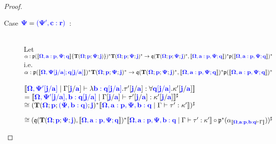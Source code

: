 \documentclass[sigplan,10pt,review,anonymous]{acmart}
\newcommand{\blum}[1]{\mathbf{\color{blue}{#1}}}
\newcommand{\sem}[1]{\llbracket #1 \rrbracket}
\newcommand{\mbf}[1]{\mathbf{#1}}
\begin{document}
\begin{proof}
\begin{description}
\begin{description}
\item[Case $\blum{\Psi} = \blum{(\Psi', c : r)}$~:]~\\
Let $\alpha : \frak p(\sem{\blum{\Omega,a:p,\Psi ; q}} \{ \mbf{T}(\blum{\Omega}; \blum{p}; \blum{\Psi}; \blum{j} ) \})^* \mbf{T}(\blum{\Omega}; \blum{p}; \blum{\Psi}; \blum{j} )^* \to \frak q(\mbf{T}(\blum{\Omega};\blum{p};\blum{\Psi};\blum{j})^*, \sem{\blum{\Omega,a:p,\Psi ; q}})^* \frak p(\sem{\blum{\Omega,a:p,\Psi ; q}})^*$\\
i.e. $\alpha : \frak p(\sem{\blum{\Omega,\Psi[j/a] ; q[j/a]}})^* \mbf{T}(\blum{\Omega}; \blum{p}; \blum{\Psi}; \blum{j} )^* \to \frak q(\mbf{T}(\blum{\Omega};\blum{p};\blum{\Psi};\blum{j})^*, \sem{\blum{\Omega,a:p,\Psi ; q}})^* \frak p(\sem{\blum{\Omega,a:p,\Psi ; q}})^*$\\~\\
$\sem{\blum{\Omega, \Psi'[j/a]} \mid \Gamma[\blum{j}/\blum{a}] \vdash \lambda \blum{b : q[j/a]}. \tau'[\blum{j}/\blum{a}] : \forall \blum{q[j/a]}. \kappa'[\blum{j}/\blum{a}]}$\\
$= \sem{\blum{\Omega,\Psi'[j/a], b : q[j/a]} \mid \Gamma[\blum{j}/\blum{a}] \vdash \tau'[\blum{j}/\blum{a}] : \kappa'[\blum{j} / \blum{a}] }^\sharp$\\
$\cong (\mbf{T}(\blum{\Omega}; \blum{p} ; \blum{(\Psi, b:q)} ; \blum{j})^* \sem{\blum{\Omega, a : p, \Psi, b : q} \mid \Gamma \vdash \tau' : \kappa'})^\sharp$\\


\iffalse

$\cong (\frak q(\mbf{T}(\blum{\Omega};\blum{p};\blum{\Psi};\blum{j}), \sem{\blum{\Omega,a:p,\Psi ; q}})^* \sem{\blum{\Omega, a : p, \Psi, b : q} \mid \Gamma \vdash \tau' : \kappa'} \circ \frak p^*(\alpha_{\sem{\blum{\Omega, a:p, b:q} \vdash \Gamma}}) )^\sharp$\\


\end{description}
\end{description}
\end{proof}
\end{document}
